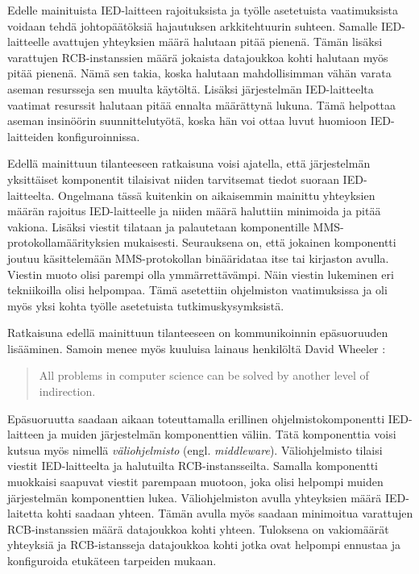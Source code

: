 Edelle mainituista IED-laitteen rajoituksista ja työlle asetetuista vaatimuksista voidaan tehdä johtopäätöksiä hajautuksen arkkitehtuurin suhteen. Samalle IED-laitteelle avattujen yhteyksien määrä halutaan pitää pienenä. Tämän lisäksi varattujen RCB-instanssien määrä jokaista datajoukkoa kohti halutaan myös pitää pienenä. Nämä sen takia, koska halutaan mahdollisimman vähän varata aseman resursseja sen muulta käytöltä. Lisäksi järjestelmän IED-laitteelta vaatimat resurssit halutaan pitää ennalta määrättynä lukuna. Tämä helpottaa aseman insinöörin suunnittelutyötä, koska hän voi ottaa luvut huomioon IED-laitteiden konfiguroinnissa.

Edellä mainittuun tilanteeseen ratkaisuna voisi ajatella, että järjestelmän yksittäiset komponentit tilaisivat niiden tarvitsemat tiedot suoraan IED-laitteelta. Ongelmana tässä kuitenkin on aikaisemmin mainittu yhteyksien määrän rajoitus IED-laitteelle ja niiden määrä haluttiin minimoida ja pitää vakiona. Lisäksi viestit tilataan ja palautetaan komponentille MMS-protokollamäärityksien mukaisesti. Seurauksena on, että jokainen komponentti joutuu käsittelemään MMS-protokollan binääridataa itse tai kirjaston avulla. Viestin muoto olisi parempi olla ymmärrettävämpi. Näin viestin lukeminen eri tekniikoilla olisi helpompaa. Tämä asetettiin ohjelmiston vaatimuksissa ja oli myös yksi kohta työlle asetetuista tutkimuskysymksistä.

Ratkaisuna edellä mainittuun tilanteeseen on kommunikoinnin epäsuoruuden lisääminen. Samoin menee myös kuuluisa lainaus henkilöltä David Wheeler \cite[s.~290]{beautiful-code}:
\begin{quote}
	All problems in computer science can be solved by another level of indirection.
\end{quote}
Epäsuoruutta saadaan aikaan toteuttamalla erillinen ohjelmistokomponentti IED-laitteen ja muiden järjestelmän komponenttien väliin. Tätä komponenttia voisi kutsua myös nimellä \emph{väliohjelmisto} (engl. \emph{middleware}). Väliohjelmisto tilaisi viestit IED-laitteelta ja halutuilta RCB-instansseilta. Samalla komponentti muokkaisi saapuvat viestit parempaan muotoon, joka olisi helpompi muiden järjestelmän komponenttien lukea. Väliohjelmiston avulla yhteyksien määrä IED-laitetta kohti saadaan yhteen. Tämän avulla myös saadaan minimoitua varattujen RCB-instanssien määrä datajoukkoa kohti yhteen. Tuloksena on vakiomäärät yhteyksiä ja RCB-istansseja datajoukkoa kohti jotka ovat helpompi ennustaa ja konfiguroida etukäteen tarpeiden mukaan.


